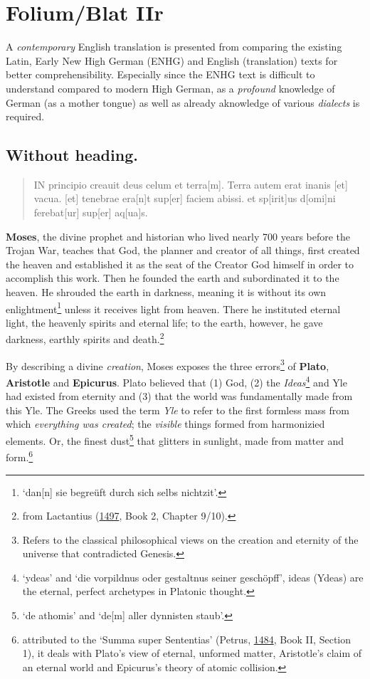 \documentclass[
]{article}
\author{Dietmar Gerald Schrausser}
\date{09.05.2026}
\begin{document}
\hypertarget{foliumblat-iir}{%
\section{Folium/Blat IIr}\label{foliumblat-iir}}

A \emph{contemporary} English translation is presented from comparing
the existing Latin, Early New High German (ENHG) and English
(translation) texts for better comprehensibility. Especially since the
ENHG text is difficult to understand compared to modern High German, as
a \emph{profound} knowledge of German (as a mother tongue) as well as
already aknowledge of various \emph{dialects} is required.

\hypertarget{without-heading.}{%
\subsection{Without heading.}\label{without-heading.}}

\begin{quote}
IN principio creauit deus celum et terra{[}m{]}. Terra autem erat inanis
{[}et{]} vacua. {[}et{]} tenebrae era{[}n{]}t sup{[}er{]} faciem abissi.
et sp{[}irit{]}us d{[}omi{]}ni ferebat{[}ur{]} sup{[}er{]} aq{[}ua{]}s.
\end{quote}

\textbf{Moses}, the divine prophet and historian who lived nearly 700
years before the Trojan War, teaches that God, the planner and creator
of all things, first created the heaven and established it as the seat
of the Creator God himself in order to accomplish this work. Then he
founded the earth and subordinated it to the heaven. He shrouded the
earth in darkness, meaning it is without its own enlightment\footnote{`dan{[}n{]}
  sie begreüft durch sich selbs nichtzit'.} unless it receives light
from heaven. There he instituted eternal light, the heavenly spirits and
eternal life; to the earth, however, he gave darkness, earthly spirits
and death.\footnote{from Lactantius
  (\href{https://books.google.com/books?id=qGsnghsi3uUC}{1497}, Book 2,
  Chapter 9/10).}

By describing a divine \emph{creation}, Moses exposes the three
errors\footnote{Refers to the classical philosophical views on the
  creation and eternity of the universe that contradicted Genesis.} of
\textbf{Plato}, \textbf{Aristotle} and \textbf{Epicurus}. Plato believed
that (1) God, (2) the \emph{Ideas}\footnote{`ydeas' and `die vorpildnus
  oder gestaltnus seiner geschöpff', ideas (Ydeas) are the eternal,
  perfect archetypes in Platonic thought.} and Yle had existed from
eternity and (3) that the world was fundamentally made from this Yle.
The Greeks used the term \emph{Yle} to refer to the first formless mass
from which \emph{everything was created}; the \emph{visible} things
formed from harmonizied elements. Or, the finest dust\footnote{`de
  athomis' and `de{[}m{]} aller dynnisten staub'.} that glitters in
sunlight, made from matter and form.\footnote{attributed to the `Summa
  super Sententias' (Petrus,
  \href{https://doi.org/10.3931/e-rara-18241}{1484}, Book II, Section
  1), it deals with Plato's view of eternal, unformed matter,
  Aristotle's claim of an eternal world and Epicurus's theory of atomic
  collision.}
\end{document}
